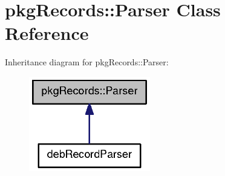 \section{pkg\-Records\-:\-:\-Parser \-Class \-Reference}
\label{classpkgRecords_1_1Parser}


\-Inheritance diagram for pkg\-Records\-:\-:\-Parser\-:
\nopagebreak
\begin{figure}[H]
\begin{center}
\leavevmode
\includegraphics[width=150pt]{classpkgRecords_1_1Parser__inherit__graph}
\end{center}
\end{figure}
